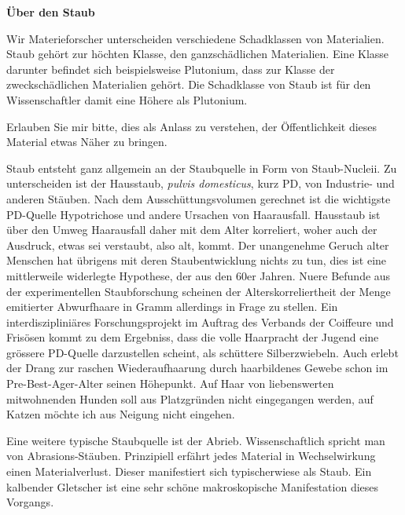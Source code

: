\thispagestyle{empty}
\begin{center}
\end{center}
\vskip 2cm
{\Large\color{farbe}\hfill{\merriweathersans \textbf{Über den Staub}}}
\newpage
\lettrine[lines=2, lhang=.2, loversize=.25, lraise=0.05, findent=0.1em,
nindent=0em]{W}{}ir Materieforscher unterscheiden verschiedene Schadklassen von Materialien. Staub gehört zur höchten Klasse, den ganzschädlichen Materialien. Eine Klasse darunter befindet sich beispielsweise Plutonium, dass zur Klasse der zweckschädlichen Materialien gehört. Die Schadklasse von Staub ist für den Wissenschaftler damit eine Höhere als Plutonium.  

Erlauben Sie mir bitte, dies als Anlass zu verstehen, der Öffentlichkeit dieses Material etwas Näher zu bringen. 

Staub entsteht ganz allgemein an der Staubquelle in Form von  Staub-Nucleii. Zu unterscheiden ist der Hausstaub, \textit{pulvis domesticus}, kurz PD, von Industrie- und anderen Stäuben. Nach dem Ausschüttungsvolumen gerechnet ist die wichtigste PD-Quelle Hypotrichose und andere Ursachen von Haarausfall. Hausstaub ist über den Umweg Haarausfall daher mit dem Alter korreliert, woher auch der Ausdruck, etwas sei verstaubt, also alt, kommt. Der unangenehme Geruch alter Menschen hat übrigens mit deren Staubentwicklung nichts zu tun, dies ist eine mittlerweile widerlegte Hypothese, der aus den 60er Jahren. Nuere Befunde aus der experimentellen Staubforschung scheinen der Alterskorreliertheit der Menge emitierter Abwurfhaare in Gramm allerdings in Frage zu stellen. Ein interdiszipliniäres Forschungsprojekt im Auftrag des Verbands der Coiffeure und Frisösen kommt zu dem Ergebniss, dass die volle Haarpracht der Jugend eine grössere PD-Quelle darzustellen scheint, als schüttere Silberzwiebeln. Auch erlebt der Drang zur raschen Wiederaufhaarung durch haarbildenes Gewebe schon im Pre-Best-Ager-Alter seinen Höhepunkt. Auf Haar von liebenswerten mitwohnenden Hunden soll aus Platzgründen nicht eingegangen werden, auf Katzen möchte ich aus Neigung nicht eingehen.

Eine weitere typische Staubquelle ist der Abrieb. Wissenschaftlich spricht man von Abrasions-Stäuben. Prinzipiell erfährt jedes Material in Wechselwirkung einen Materialverlust. Dieser manifestiert sich typischerwiese als Staub. Ein kalbender Gletscher ist eine sehr schöne makroskopische Manifestation dieses Vorgangs.

